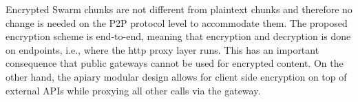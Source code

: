         
Encrypted Swarm chunks are not different from plaintext chunks and therefore no change is needed on the P2P protocol level to accommodate them. The proposed encryption scheme is end-to-end, meaning that encryption and decryption is done on endpoints, i.e., where the http proxy layer runs. This has an important consequence that public gateways cannot be used for encrypted content. On the other hand, the apiary modular design allows for client side encryption on top of external  APIs while proxying all other calls via the gateway.


